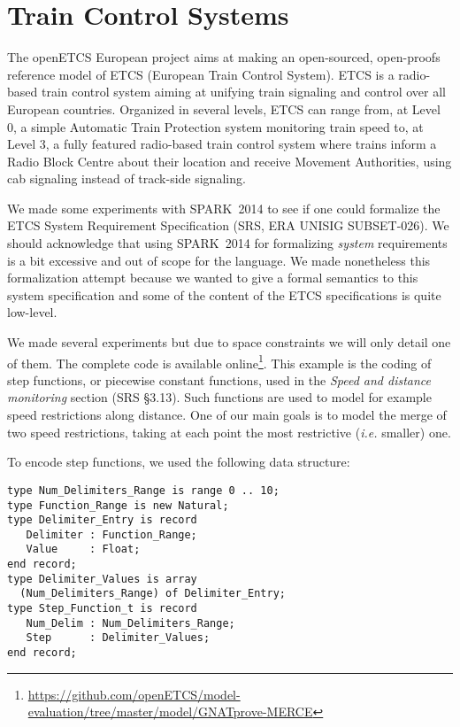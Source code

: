 \documentclass[10pt,a4paper,twocolumn]{article}
\newcommand{\openetcs}{openETCS\xspace}
\newcommand{\newspark}{SPARK~2014\xspace}
\newcommand{\ie}{\textit{i.e.}\xspace}
\begin{document}
\section{Train Control Systems}
\label{sec:openETCS}



The \openetcs European project aims at making an open-sourced,
open-proofs reference model of ETCS (European Train Control
System). ETCS is a radio-based train control system aiming at unifying
train signaling and control over all European countries. Organized in
several levels, ETCS can range from, at Level 0, a simple Automatic
Train Protection system monitoring train speed to, at Level 3, a fully
featured radio-based train control system where trains inform a Radio
Block Centre about their location and receive Movement Authorities,
using cab signaling instead of track-side signaling.

We made some experiments with \newspark to see if one could formalize
the ETCS System Requirement Specification (SRS, ERA UNISIG
SUBSET-026). We should acknowledge that using \newspark for
formalizing \emph{system} requirements is a bit excessive and out of
scope for the language. We made nonetheless this formalization attempt
because we wanted to give a formal semantics to this system
specification and some of the content of the ETCS specifications is
quite low-level.


We made several experiments but due to space constraints we will only
detail one of them. The complete code is available
online\footnote{\url{https://github.com/openETCS/model-evaluation/tree/master/model/GNATprove-MERCE}}.
This example is the coding of step functions, or piecewise constant
functions, used in the \textit{Speed and distance monitoring} section
(SRS §3.13). Such functions are used to model for example speed
restrictions along distance. One of our main goals is to model the
merge of two speed restrictions, taking at each point the most
restrictive (\ie smaller) one.

To encode step functions, we used the following data structure:
\begin{lstlisting}
type Num_Delimiters_Range is range 0 .. 10;
type Function_Range is new Natural;
type Delimiter_Entry is record
   Delimiter : Function_Range;
   Value     : Float;
end record;
type Delimiter_Values is array
  (Num_Delimiters_Range) of Delimiter_Entry;
type Step_Function_t is record
   Num_Delim : Num_Delimiters_Range;
   Step      : Delimiter_Values;
end record;
\end{lstlisting}
\end{document}
